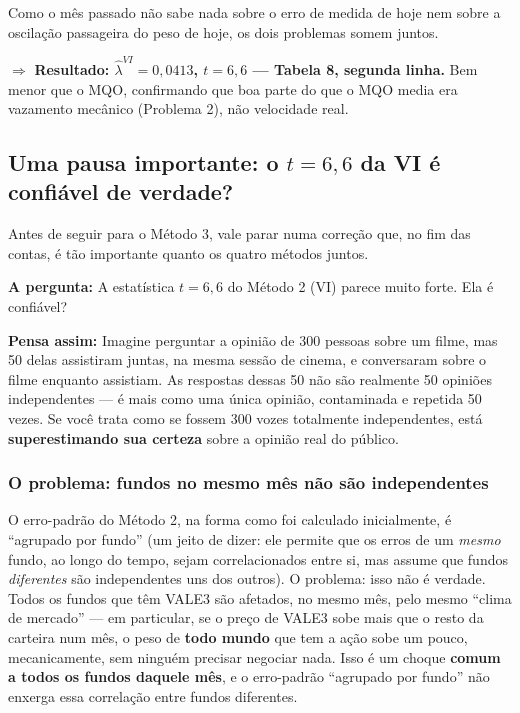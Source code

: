 \documentclass[11pt,a4paper]{article}
\newcommand{\pergunta}[1]{\par\vspace{4pt}\noindent\textbf{\color{azul}A pergunta:} #1\par\vspace{2pt}}
\newcommand{\analogia}[1]{\par\vspace{4pt}\noindent\textbf{\color{verde}Pensa assim:} #1\par\vspace{2pt}}
\begin{document}
Como o mês passado não sabe nada sobre o erro de medida de hoje nem sobre a oscilação
passageira do peso de hoje, os dois problemas somem juntos.

$\Rightarrow$ \textbf{Resultado: $\widehat\lambda^{VI}=0{,}0413$, $t=6{,}6$ --- Tabela 8, segunda linha.}
Bem menor que o MQO, confirmando que boa parte do que o MQO media era vazamento mecânico
(Problema 2), não velocidade real.

\subsection{Uma pausa importante: o $t=6{,}6$ da VI é confiável de verdade?}
\label{sec:cluster}

Antes de seguir para o Método 3, vale parar numa correção que, no fim das contas, é tão
importante quanto os quatro métodos juntos.

\pergunta{A estatística $t=6{,}6$ do Método 2 (VI) parece muito forte. Ela é confiável?}

\analogia{Imagine perguntar a opinião de 300 pessoas sobre um filme, mas 50 delas assistiram
juntas, na mesma sessão de cinema, e conversaram sobre o filme enquanto assistiam. As respostas
dessas 50 não são realmente 50 opiniões independentes --- é mais como uma única opinião,
contaminada e repetida 50 vezes. Se você trata como se fossem 300 vozes totalmente
independentes, está \textbf{superestimando sua certeza} sobre a opinião real do público.}

\subsubsection*{O problema: fundos no mesmo mês não são independentes}

O erro-padrão do Método 2, na forma como foi calculado inicialmente, é ``agrupado por fundo''
(um jeito de dizer: ele permite que os erros de um \emph{mesmo} fundo, ao longo do tempo, sejam
correlacionados entre si, mas assume que fundos \emph{diferentes} são independentes uns dos
outros). O problema: isso não é verdade. Todos os fundos que têm VALE3 são afetados, no mesmo
mês, pelo mesmo ``clima de mercado'' --- em particular, se o preço de VALE3 sobe mais que o resto
da carteira num mês, o peso de \textbf{todo mundo} que tem a ação sobe um pouco, mecanicamente,
sem ninguém precisar negociar nada. Isso é um choque \textbf{comum a todos os fundos daquele
mês}, e o erro-padrão ``agrupado por fundo'' não enxerga essa correlação entre fundos diferentes.
\end{document}
